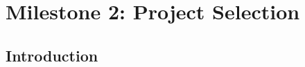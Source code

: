 \documentclass{report}
\begin{document}
\chapter{Milestone 2: Project Selection}


\section{Introduction}
\end{document}
